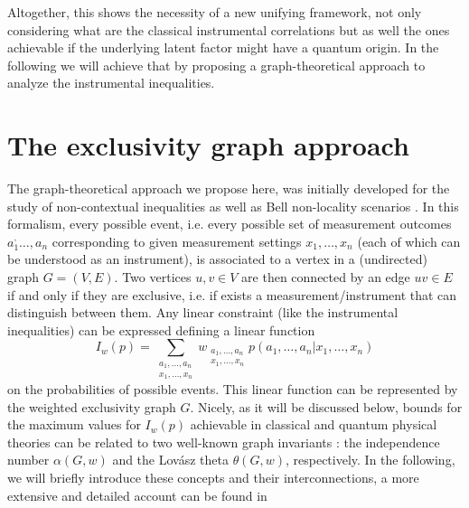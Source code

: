 \documentclass[letterpaper]{article}
\newcommand{\avg}[1]{\langle#1\rangle}
\begin{document}
Altogether, this shows the necessity of a new unifying framework, not only
considering what are the classical instrumental correlations but as well the
ones achievable if the underlying latent factor might have a quantum origin. In
the following we will achieve that by proposing a graph-theoretical approach to analyze the instrumental inequalities.


\section*{The exclusivity graph approach}

The graph-theoretical approach we propose here, was initially developed for the
study of non-contextual inequalities \cite{cabello2014} as well as Bell
non-locality scenarios \cite{acin2015}. 
In this formalism, every possible event, i.e. every possible set of measurement
outcomes $a_1^,\ldots, a_n$ corresponding to given measurement settings
$x_1,\ldots,x_n$ (each of which can be understood as an instrument), is
associated to a vertex in a (undirected) graph $G = (V, E)$. Two vertices $u, v
\in V$ are then connected by an edge $uv \in E$ if and only if they are
exclusive, i.e.  if exists a measurement/instrument that can distinguish between
them. Any linear constraint (like the instrumental inequalities) can be
expressed defining a linear function
\begin{equation}
    I_w(p) = \sum_{\substack{a_1,\ldots,a_n\\x_1,\ldots,x_n}}
w_{\substack{a_1,\ldots,a_n\\x_1,\ldots,x_n}} p(a_1,\ldots,a_n|x_1,\ldots,x_n)
\end{equation}
on the probabilities of possible events. This linear function can be represented
by the weighted exclusivity graph $G$. Nicely, as it will be discussed below,
bounds for the maximum values for $ I_w(p)$ achievable in classical and quantum
physical theories can be related to two well-known graph invariants \cite{}: the
independence number $\alpha(G, w)$ and the Lovász theta $\theta(G, w)$,
respectively. In the following, we will briefly introduce these concepts and
their interconnections, a more extensive and detailed account can be found in
\cite{cabello2014, rabelo2014,acin2015}
\end{document}
